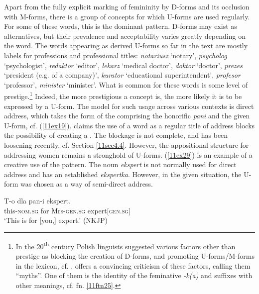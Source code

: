 \documentclass[output=paper,colorlinks,citecolor=brown]{langscibook}
\begin{document}
Apart from the fully explicit marking of femininity by D-forms and its occlusion with M-forms, there is a group of concepts for which U-forms are used regularly. For some of these words, this is the dominant pattern. D-forms may exist as alternatives, but their prevalence and acceptability varies greatly depending on the word. The words appearing as derived U-forms so far in the text are mostly labels for professions and professional titles: \emph{notariusz} `notary', \emph{psycholog} `psychologist', \emph{redaktor} `editor', \emph{lekarz} `medical doctor', \emph{doktor} `doctor', \emph{prezes} `president (e.g. of a company)', \emph{kurator} `educational superintendent', \emph{profesor} `professor', \emph{minister} `minister'. What is common for these words is some level of prestige.\footnote{In the 20\textsuperscript{th} century Polish linguists suggested various factors other than prestige as blocking the creation of D-forms, and promoting U-forms/M-forms in the lexicon, cf. \citet[108--110]{buttlerkurkowskasatkiewicz1973}. \citet[190--241]{szpyra-kozlowska2021} offers a convincing criticism of these factors, calling them ``myths''. One of them is the identity of the feminative \emph{-k(a)} and suffixes with other meanings, cf. fn. \ref{11ftn25}.} Indeed, the more prestigious a concept is, the more likely it is to be expressed by a U-form. The model for such usage across various contexts is direct address, which takes the form of the  comprising the honorific \emph{pani} and the given U-form, cf. (\ref{11ex19}). \citet[275--276]{lazinski2006} claims the use of a word as a regular title of address blocks the possibility of creating a . The blockage is not complete, and has been loosening recently, cf. Section \ref{11sec4.4}. However, the appositional structure for addressing women remains a stronghold of U-forms. (\ref{11ex29}) is an example of a creative use of the pattern. The noun \emph{ekspert} is not normally used for direct address and has an established  \emph{ekspertka}. However, in the given situation, the U-form was chosen as a way of semi-direct address.

\begin{exe}
	\ex \label{11ex29}
	\gll T-o dla pan-i ekspert. \\
	this-\textsc{nom.sg} for Mrs-\textsc{gen.sg} expert[\textsc{gen.sg}] \\
	\trans ‘This is for [you,] expert.’ \hfill (NKJP)
\end{exe}
\end{document}
